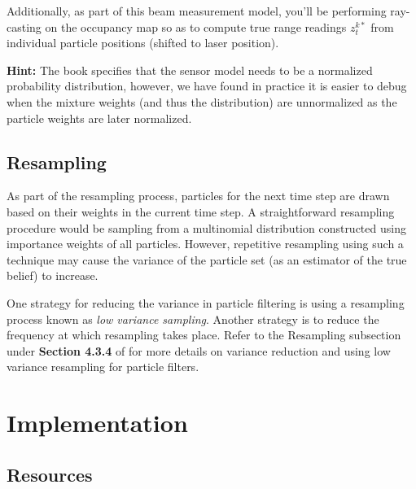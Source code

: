 \documentclass[12pt, a4paper]{article}
\begin{document}
Additionally, as part of this beam measurement model, you'll be performing
ray-casting on the occupancy map so as to compute true range readings
$z^{k*}_t$ from individual particle positions (shifted to laser position).

\textbf{Hint:} The book specifies that the sensor model needs to be a normalized
probability distribution, however, we have found in practice it is easier to debug
when the mixture weights (and thus the distribution) are unnormalized as the particle
weights are later normalized.

\subsection*{Resampling}

As part of the resampling process, particles for the next time step
are drawn based on their weights in the current time step. A straightforward
resampling procedure would be sampling from a multinomial distribution
constructed using importance weights of all particles. However, repetitive
resampling using such a technique may cause the variance of the particle
set (as an estimator of the true belief) to increase.

One strategy for reducing the variance in particle filtering is using
a resampling process known as \emph{low variance sampling}. Another
strategy is to reduce the frequency at which resampling takes place.
Refer to the Resampling subsection under \textbf{Section 4.3.4 }of\textbf{
}\cite{thrun2005probabilistic}\textbf{ }for more details on variance
reduction and using low variance resampling for particle filters.


\section{Implementation}

\subsection*{Resources}
\end{document}
